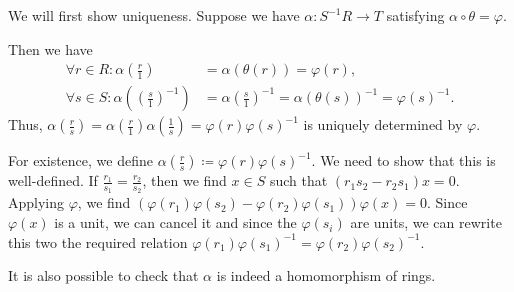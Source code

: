 We will first show uniqueness. Suppose we have $\alpha\colon S^{-1}R\to T$ satisfying
$\alpha \circ \theta = \varphi$.

Then we have
\begin{align*}
	\forall r \in R\colon \alpha(\frac{r}{1}) &= \alpha(\theta(r)) = \varphi(r),\\
	\forall s \in S\colon \alpha((\frac{s}{1})^{-1})&=\alpha(\frac{s}{1})^{-1} = \alpha(\theta(s))^{-1} = \varphi(s)^{-1}.
\end{align*}
Thus, $\alpha(\frac{r}{s}) = \alpha(\frac{r}{1})\alpha(\frac{1}{s}) = \varphi(r)\varphi(s)^{-1}$ is
uniquely determined by $\varphi$.

For existence, we define $\alpha(\frac{r}{s})\coloneqq \varphi(r)\varphi(s)^{-1}$.
We need to show that this is well-defined. If $\frac{r_1}{s_1}=\frac{r_2}{s_2}$,
then we find $x \in S$ such that $(r_1s_2 - r_2s_1)x = 0$. Applying $\varphi$,
we find $(\varphi(r_1)\varphi(s_2) - \varphi(r_2)\varphi(s_1))\varphi(x) = 0$.
Since $\varphi(x)$ is a unit, we can cancel it and since the $\varphi(s_i)$ are
units, we can rewrite this two the required relation
$\varphi(r_1)\varphi(s_1)^{-1} = \varphi(r_2)\varphi(s_2)^{-1}$.

It is also possible to check that $\alpha$ is indeed a homomorphism of rings.
